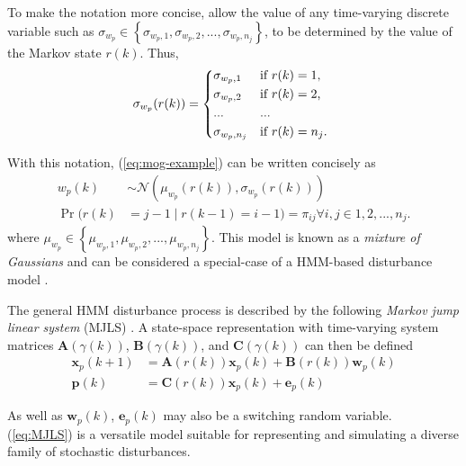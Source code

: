 To make the notation more concise, allow the value of any time-varying discrete variable such as $\sigma_{w_p} \in \left\{\sigma_{w_p,1}, \sigma_{w_p,2},..., \sigma_{w_p,n_j}\right\}$, to be determined by the value of the Markov state $r(k)$. Thus,
\begin{equation} \label{eq:A-selection}
	\sigma_{w_p}(r(k)) = 
	\begin{cases*}
		\sigma_{w_p,1} & if $r(k)=1$, \\
		\sigma_{w_p,2} & if $r(k)=2$, \\
		... & ...\\
		\sigma_{w_p,n_j} & if $r(k)=n_j$.
	\end{cases*}
\end{equation}

With this notation, (\ref{eq:mog-example}) can be written concisely as
\begin{equation} \label{eq:mog-example2}
	\begin{aligned}
		w_p(k) &\sim \mathcal{N}\left(\mu_{w_p}(r(k)), \sigma_{w_p}(r(k))\right) \\
		\Pr(r(k) &= j-1 \mid r(k-1)=i-1)=\pi_{ij} \forall i,j \in {1,2,...,n_j}.
	\end{aligned}
\end{equation}
where $\mu_{w_p}\in\left\{\mu_{w_p,1},\mu_{w_p,2},...,\mu_{w_p,n_j}\right\}$. This model is known as a \textit{mixture of Gaussians} and can be considered a special-case of a HMM-based disturbance model \citep{wong_disturbance_2007}.

The general \gls{HMM} disturbance process is described by the following \textit{Markov jump linear system} (\acrshort{MJLS}) \citep{costa_discrete-time_2005}. A state-space representation with time-varying system matrices $\mathbf{A}(\gamma(k))$, $\mathbf{B}(\gamma(k))$, and $\mathbf{C}(\gamma(k))$ can then be defined
\begin{equation} \label{eq:MJLS}
	\begin{aligned}
	\mathbf{x}_p(k+1) &= \mathbf{A}(r(k)) \mathbf{x}_p(k) + \mathbf{B}(r(k))\mathbf{w}_p(k) \\
	\mathbf{p}(k) &= \mathbf{C}(r(k)) \mathbf{x}_p(k) + \mathbf{e}_p(k)
	\end{aligned}
\end{equation}

As well as $\mathbf{w}_p(k)$, $\mathbf{e}_p(k)$ may also be a switching random variable. (\ref{eq:MJLS}) is a versatile model suitable for representing and simulating a diverse family of stochastic disturbances.


